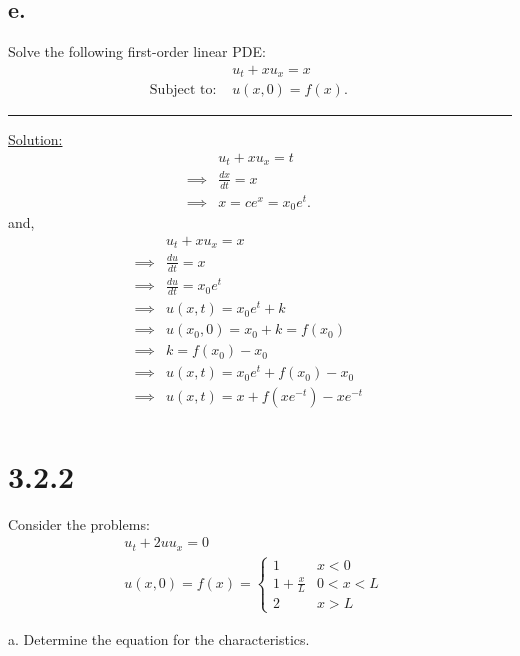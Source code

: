 \documentclass{article}
\begin{document}
\newpage

\subsection*{e.}
Solve the following first-order linear PDE:
\begin{align*}
  &u_t + x u_x= x &&\\
  \text{Subject to: }& u(x,0) = f(x).
\end{align*}

\begin{center}
  \noindent\rule{8cm}{0.4pt}
\end{center}

\underline{Solution:}
\begin{align*}
  &u_t + x u_x= t &&\\
  \implies& \frac{dx}{dt} = x &&\\
  \implies& x = ce^x = x_0e^t.
\end{align*}
and,
\begin{align*}
  &u_t + x u_x= x &&\\
  \implies& \frac{du}{dt} = x &&\\
  \implies& \frac{du}{dt} = x_0 e^t &&\\
  \implies& u(x,t) = x_0 e^t + k &&\\
  \implies& u(x_0,0) = x_0 + k = f(x_0) &&\\
  \implies& k = f(x_0) - x_0 &&\\
  \implies& u(x,t) = x_0 e^t + f(x_0) - x_0 &&\\
  \implies& u(x,t) = x + f(xe^{-t}) - xe^{-t} &&\\
\end{align*}

\newpage

\section*{3.2.2}

Consider the problems:
\begin{align*}
  &u_t + 2uu_x = 0 &&\\
  &u(x,0) = f(x) = \begin{cases}
    1 & x < 0 \\
    1 + \frac{x}{L} & 0 < x < L \\
    2 & x > L
  \end{cases}
\end{align*}

a. Determine the equation for the characteristics.
\end{document}
